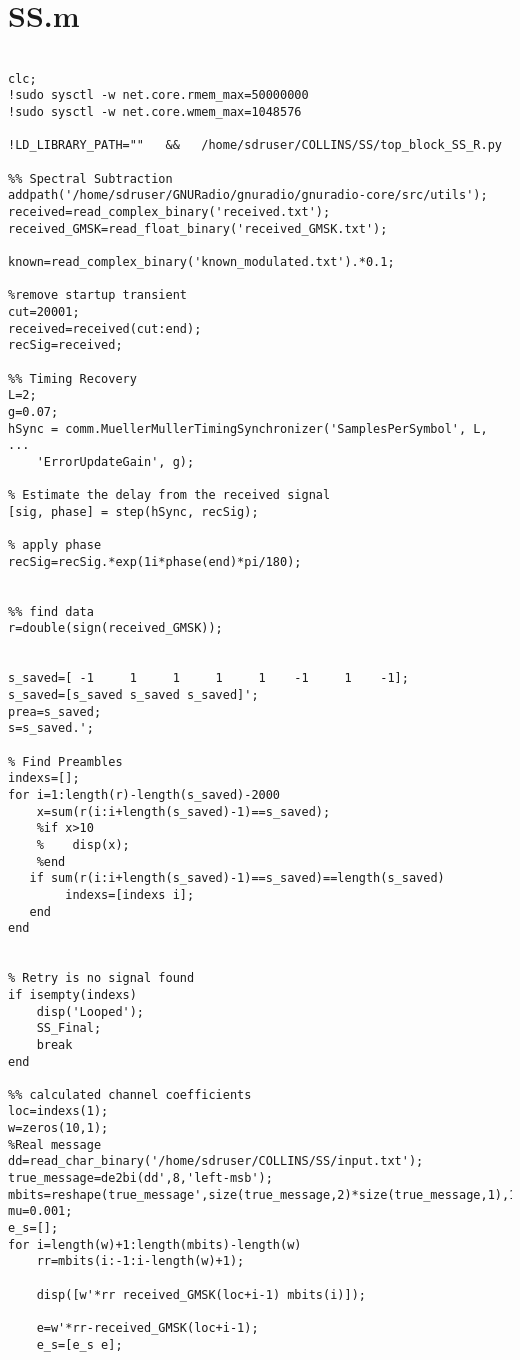 \chapter{SS.m}
\begin{lstlisting}[breaklines]

clc;
!sudo sysctl -w net.core.rmem_max=50000000
!sudo sysctl -w net.core.wmem_max=1048576

!LD_LIBRARY_PATH=""   &&   /home/sdruser/COLLINS/SS/top_block_SS_R.py

%% Spectral Subtraction
addpath('/home/sdruser/GNURadio/gnuradio/gnuradio-core/src/utils');
received=read_complex_binary('received.txt');
received_GMSK=read_float_binary('received_GMSK.txt');

known=read_complex_binary('known_modulated.txt').*0.1;

%remove startup transient
cut=20001;
received=received(cut:end);
recSig=received;

%% Timing Recovery
L=2;
g=0.07;
hSync = comm.MuellerMullerTimingSynchronizer('SamplesPerSymbol', L, ...
    'ErrorUpdateGain', g);

% Estimate the delay from the received signal
[sig, phase] = step(hSync, recSig);

% apply phase
recSig=recSig.*exp(1i*phase(end)*pi/180);


%% find data
r=double(sign(received_GMSK));
                
                
s_saved=[ -1     1     1     1     1    -1     1    -1];
s_saved=[s_saved s_saved s_saved]';
prea=s_saved;
s=s_saved.';

% Find Preambles
indexs=[];
for i=1:length(r)-length(s_saved)-2000
    x=sum(r(i:i+length(s_saved)-1)==s_saved);
    %if x>10
    %    disp(x);
    %end
   if sum(r(i:i+length(s_saved)-1)==s_saved)==length(s_saved)
        indexs=[indexs i]; 
   end
end


% Retry is no signal found
if isempty(indexs)
    disp('Looped');
    SS_Final;
    break
end

%% calculated channel coefficients
loc=indexs(1);
w=zeros(10,1);
%Real message
dd=read_char_binary('/home/sdruser/COLLINS/SS/input.txt');
true_message=de2bi(dd',8,'left-msb');
mbits=reshape(true_message',size(true_message,2)*size(true_message,1),1);
mu=0.001;
e_s=[];
for i=length(w)+1:length(mbits)-length(w)
    rr=mbits(i:-1:i-length(w)+1);
    
    disp([w'*rr received_GMSK(loc+i-1) mbits(i)]);
    
    e=w'*rr-received_GMSK(loc+i-1);
    e_s=[e_s e];
    

\end{lstlisting}
